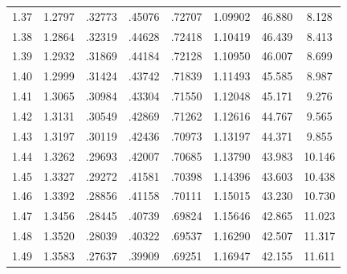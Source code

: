 \begin{minipage}{0.49\textwidth}
{\begin{tabular}{c|c|c|c|c|c|c|c}
        1.37 & 1.2797 & .32773 & .45076 & .72707 & 1.09902 & 46.880 & 8.128 \\
        1.38 & 1.2864 & .32319 & .44628 & .72418 & 1.10419 & 46.439 & 8.413 \\
        1.39 & 1.2932 & .31869 & .44184 & .72128 & 1.10950 & 46.007 & 8.699 \\
        1.40 & 1.2999 & .31424 & .43742 & .71839 & 1.11493 & 45.585 & 8.987 \\
        1.41 & 1.3065 & .30984 & .43304 & .71550 & 1.12048 & 45.171 & 9.276 \\
        1.42 & 1.3131 & .30549 & .42869 & .71262 & 1.12616 & 44.767 & 9.565 \\
        1.43 & 1.3197 & .30119 & .42436 & .70973 & 1.13197 & 44.371 & 9.855 \\
        1.44 & 1.3262 & .29693 & .42007 & .70685 & 1.13790 & 43.983 & 10.146 \\
        1.45 & 1.3327 & .29272 & .41581 & .70398 & 1.14396 & 43.603 & 10.438 \\
        1.46 & 1.3392 & .28856 & .41158 & .70111 & 1.15015 & 43.230 & 10.730 \\
        1.47 & 1.3456 & .28445 & .40739 & .69824 & 1.15646 & 42.865 & 11.023 \\
        1.48 & 1.3520 & .28039 & .40322 & .69537 & 1.16290 & 42.507 & 11.317 \\
        1.49 & 1.3583 & .27637 & .39909 & .69251 & 1.16947 & 42.155 & 11.611 \\
    \end{tabular}
    }
\end{minipage}%
\vline
